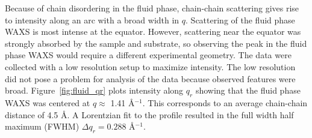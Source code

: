 Because of chain disordering in the fluid phase, chain-chain scattering
gives rise to intensity along an arc \cite{ref:Mills08} with a broad
width in $q$. 
Scattering of the fluid phase WAXS
is most intense at the equator. However, scattering near the equator
was strongly absorbed by the sample and substrate, so observing the 
peak in the fluid phase WAXS would require a different experimental 
geometry.
The data were collected with a low resolution setup to maximize
intensity. The low resolution did not pose a problem for analysis of the 
data because observed features were broad.
Figure~\ref{fig:fluid_qr} plots intensity along $q_r$ showing that
the fluid phase WAXS was centered at $q \approx$ 1.41 \AA$^{-1}$. 
This corresponds to an average chain-chain distance of 4.5 \AA. 
A Lorentzian fit to the profile resulted in the full width half maximum
(FWHM) $\Delta q_r=0.288$ \AA$^{-1}$.

